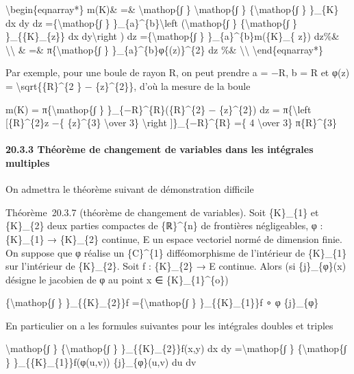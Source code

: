 \documentclass[]{article}
\begin{document}
\textbackslash{}begin\{eqnarray*\} m(K)\& =\& \textbackslash{}mathop\{∫
\} \textbackslash{}mathop\{∫ \} \{\textbackslash{}mathop\{∫ \} \}\_\{K\}
dx dy dz =\{\textbackslash{}mathop\{∫ \}
\}\_\{a\}\^{}\{b\}\textbackslash{}left (\textbackslash{}mathop\{∫ \}
\{\textbackslash{}mathop\{∫ \} \}\_\{\{K\}\_\{z\}\} dx
dy\textbackslash{}right ) dz =\{\textbackslash{}mathop\{∫ \}
\}\_\{a\}\^{}\{b\}m(\{K\}\_\{ z\}) dz\%\&
\textbackslash{}\textbackslash{} \& =\& π\{\textbackslash{}mathop\{∫ \}
\}\_\{a\}\^{}\{b\}φ\{(z)\}\^{}\{2\} dz \%\&
\textbackslash{}\textbackslash{} \textbackslash{}end\{eqnarray*\}

Par exemple, pour une boule de rayon R, on peut prendre a = −R, b = R et
φ(z) = \textbackslash{}sqrt\{\{R\}\^{}\{2 \} − \{z\}\^{}\{2\}\}, d'où la
mesure de la boule

m(K) = π\{\textbackslash{}mathop\{∫ \}
\}\_\{−R\}\^{}\{R\}(\{R\}\^{}\{2\} − \{z\}\^{}\{2\}) dz =
π\{\textbackslash{}left {[}\{R\}\^{}\{2\}z −\{ \{z\}\^{}\{3\}
\textbackslash{}over 3\} \textbackslash{}right {]}\}\_\{−R\}\^{}\{R\}
=\{ 4 \textbackslash{}over 3\} π\{R\}\^{}\{3\}

\paragraph{20.3.3 Théorème de changement de variables dans les
intégrales multiples}

On admettra le théorème suivant de démonstration difficile

Théorème~20.3.7 (théorème de changement de variables). Soit \{K\}\_\{1\}
et \{K\}\_\{2\} deux parties compactes de \{ℝ\}\^{}\{n\} de frontières
négligeables, φ : \{K\}\_\{1\} → \{K\}\_\{2\} continue, E un espace
vectoriel normé de dimension finie. On suppose que φ réalise un
\{C\}\^{}\{1\} difféomorphisme de l'intérieur de \{K\}\_\{1\} sur
l'intérieur de \{K\}\_\{2\}. Soit f : \{K\}\_\{2\} → E continue. Alors
(si \{j\}\_\{φ\}(x) désigne le jacobien de φ au point x ∈
\{K\}\_\{1\}\^{}\{o\})

\{\textbackslash{}mathop\{∫ \} \}\_\{\{K\}\_\{2\}\}f
=\{\textbackslash{}mathop\{∫ \} \}\_\{\{K\}\_\{1\}\}f ∘ φ
\textbar{}\{j\}\_\{φ\}\textbar{}

En particulier on a les formules suivantes pour les intégrales doubles
et triples

\textbackslash{}mathop\{∫ \} \{\textbackslash{}mathop\{∫ \}
\}\_\{\{K\}\_\{2\}\}f(x,y) dx dy =\textbackslash{}mathop\{∫ \}
\{\textbackslash{}mathop\{∫ \} \}\_\{\{K\}\_\{1\}\}f(φ(u,v))
\textbar{}\{j\}\_\{φ\}(u,v)\textbar{} du dv
\end{document}
